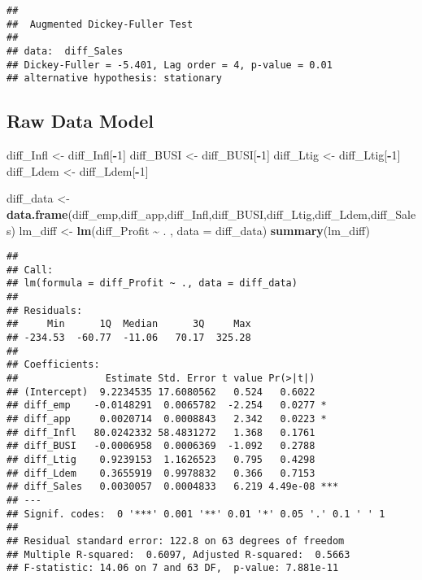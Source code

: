 \documentclass[
]{article}
\newenvironment{Shaded}{\begin{snugshade}}{\end{snugshade}}
\newcommand{\AttributeTok}[1]{\textcolor[rgb]{0.13,0.29,0.53}{#1}}
\newcommand{\DecValTok}[1]{\textcolor[rgb]{0.00,0.00,0.81}{#1}}
\newcommand{\FunctionTok}[1]{\textcolor[rgb]{0.13,0.29,0.53}{\textbf{#1}}}
\newcommand{\NormalTok}[1]{#1}
\newcommand{\OtherTok}[1]{\textcolor[rgb]{0.56,0.35,0.01}{#1}}
\newcommand{\SpecialCharTok}[1]{\textcolor[rgb]{0.81,0.36,0.00}{\textbf{#1}}}
\begin{document}
\begin{verbatim}
## 
##  Augmented Dickey-Fuller Test
## 
## data:  diff_Sales
## Dickey-Fuller = -5.401, Lag order = 4, p-value = 0.01
## alternative hypothesis: stationary
\end{verbatim}

\subsection{Raw Data Model}\label{raw-data-model}

\begin{Shaded}
\begin{Highlighting}[]
\NormalTok{diff\_Infl }\OtherTok{\textless{}{-}}\NormalTok{ diff\_Infl[}\SpecialCharTok{{-}}\DecValTok{1}\NormalTok{]}
\NormalTok{diff\_BUSI }\OtherTok{\textless{}{-}}\NormalTok{ diff\_BUSI[}\SpecialCharTok{{-}}\DecValTok{1}\NormalTok{]}
\NormalTok{diff\_Ltig }\OtherTok{\textless{}{-}}\NormalTok{ diff\_Ltig[}\SpecialCharTok{{-}}\DecValTok{1}\NormalTok{]}
\NormalTok{diff\_Ldem }\OtherTok{\textless{}{-}}\NormalTok{ diff\_Ldem[}\SpecialCharTok{{-}}\DecValTok{1}\NormalTok{]}

\NormalTok{diff\_data }\OtherTok{\textless{}{-}} \FunctionTok{data.frame}\NormalTok{(diff\_emp,diff\_app,diff\_Infl,diff\_BUSI,diff\_Ltig,diff\_Ldem,diff\_Sales)}
\NormalTok{lm\_diff }\OtherTok{\textless{}{-}} \FunctionTok{lm}\NormalTok{(diff\_Profit }\SpecialCharTok{\textasciitilde{}}\NormalTok{ . , }\AttributeTok{data =}\NormalTok{ diff\_data)}
\FunctionTok{summary}\NormalTok{(lm\_diff)}
\end{Highlighting}
\end{Shaded}

\begin{verbatim}
## 
## Call:
## lm(formula = diff_Profit ~ ., data = diff_data)
## 
## Residuals:
##     Min      1Q  Median      3Q     Max 
## -234.53  -60.77  -11.06   70.17  325.28 
## 
## Coefficients:
##               Estimate Std. Error t value Pr(>|t|)    
## (Intercept)  9.2234535 17.6080562   0.524   0.6022    
## diff_emp    -0.0148291  0.0065782  -2.254   0.0277 *  
## diff_app     0.0020714  0.0008843   2.342   0.0223 *  
## diff_Infl   80.0242332 58.4831272   1.368   0.1761    
## diff_BUSI   -0.0006958  0.0006369  -1.092   0.2788    
## diff_Ltig    0.9239153  1.1626523   0.795   0.4298    
## diff_Ldem    0.3655919  0.9978832   0.366   0.7153    
## diff_Sales   0.0030057  0.0004833   6.219 4.49e-08 ***
## ---
## Signif. codes:  0 '***' 0.001 '**' 0.01 '*' 0.05 '.' 0.1 ' ' 1
## 
## Residual standard error: 122.8 on 63 degrees of freedom
## Multiple R-squared:  0.6097, Adjusted R-squared:  0.5663 
## F-statistic: 14.06 on 7 and 63 DF,  p-value: 7.881e-11
\end{verbatim}
\end{document}
